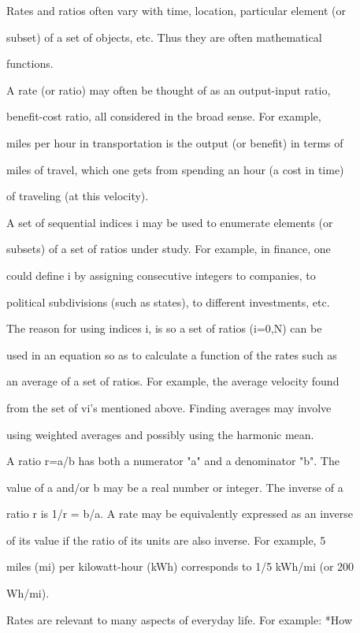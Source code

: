 Rates and ratios often vary with time, location, particular element (or

subset) of a set of objects, etc. Thus they are often mathematical

functions.



A rate (or ratio) may often be thought of as an output-input ratio,

benefit-cost ratio, all considered in the broad sense. For example,

miles per hour in transportation is the output (or benefit) in terms of

miles of travel, which one gets from spending an hour (a cost in time)

of traveling (at this velocity).



A set of sequential indices i may be used to enumerate elements (or

subsets) of a set of ratios under study. For example, in finance, one

could define i by assigning consecutive integers to companies, to

political subdivisions (such as states), to different investments, etc.

The reason for using indices i, is so a set of ratios (i=0,N) can be

used in an equation so as to calculate a function of the rates such as

an average of a set of ratios. For example, the average velocity found

from the set of vi's mentioned above. Finding averages may involve

using weighted averages and possibly using the harmonic mean.



A ratio r=a/b has both a numerator "a" and a denominator "b". The

value of a and/or b may be a real number or integer. The inverse of a

ratio r is 1/r = b/a. A rate may be equivalently expressed as an inverse

of its value if the ratio of its units are also inverse. For example, 5

miles (mi) per kilowatt-hour (kWh) corresponds to 1/5 kWh/mi (or 200

Wh/mi).



Rates are relevant to many aspects of everyday life. For example: *How

